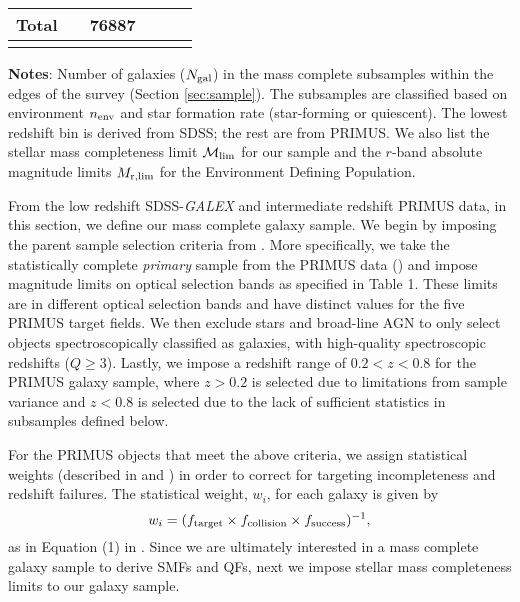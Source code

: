 \documentclass{emulateapj}
\begin{document}
\begin{table*}
\begin{center}
\begin{tabular}{ccccccc}
Total &      & \multicolumn{2}{c}{76887} & \\ \hline
  \multicolumn{4}{l}{}                                             \\       
    \end{tabular} \par
    \end{center}
    {\bf Notes}: Number of galaxies ($N_{\rm{gal}}$) in the mass complete subsamples within the edges of the survey (Section \ref{sec:sample}). The subsamples are classified based on environment $n_{\rm{env}}$ and star formation rate (star-forming or quiescent). The lowest redshift bin is derived from SDSS; the rest are from PRIMUS. We also list the stellar mass completeness limit $\mathcal{M}_{\rm{lim}}$ for our sample and the $r$-band absolute magnitude limits $M_{\rm{r}, lim}$ for the Environment Defining Population. 
    \bigskip
\end{table*}

From the low redshift SDSS-{\em GALEX} and intermediate redshift PRIMUS data, in this section, we define our mass complete galaxy sample. We begin by imposing the parent sample selection criteria from \cite{Moustakas:2013aa}. More specifically, we take the statistically complete {\em primary} sample from the PRIMUS data (\citealt{Coil:2011aa}) and impose magnitude limits on optical selection bands as specified in \cite{Moustakas:2013aa} Table 1. These limits are in different optical selection bands and have distinct values for the five PRIMUS target fields. We then exclude stars and broad-line AGN to only select objects spectroscopically classified as galaxies, with high-quality spectroscopic redshifts ($Q \geq 3$). Lastly, we impose a redshift range of $ 0.2 < z < 0.8$ for the PRIMUS galaxy sample, where $ z > 0.2$ is selected due to limitations from sample variance and $ z < 0.8$ is selected due to the lack of sufficient statistics in subsamples defined below. 

For the PRIMUS objects that meet the above criteria, we assign statistical weights (described in \citealt{Coil:2011aa} and \citealt{Cool:2013aa}) in order to correct for targeting incompleteness and redshift failures. The statistical weight, $w_i$, for each galaxy is given by
\begin{equation}
w_{i} = (f_{\rm{target}} \times f_{\rm{collision}} \times f_{\rm{success}})^{-1},
\end{equation}
as in Equation (1) in \cite{Moustakas:2013aa}. Since we are ultimately interested in a mass complete galaxy sample to derive SMFs and QFs, next we impose stellar mass completeness limits to our galaxy sample. 
\end{document}
